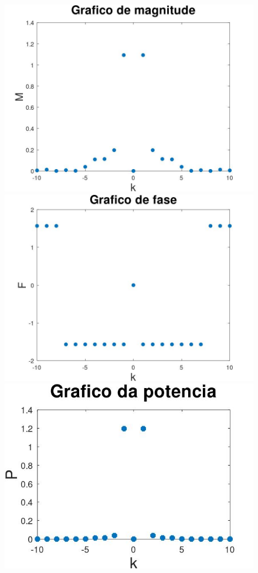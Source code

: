 \documentclass{article}
\begin{document}
\begin{figure}[h!]
    \includegraphics[scale=0.25]{plot4dm}
    \includegraphics[scale=0.25]{plot4df}
    \includegraphics[scale=0.4]{plot4dp}
\end{figure}
\end{document}
